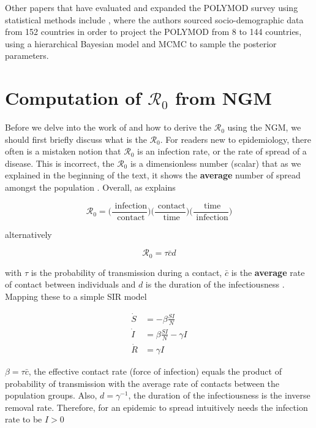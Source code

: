 \documentclass[12pt]{article}
\begin{document}
Other papers that have evaluated and expanded the POLYMOD survey using statistical methods include \cite{Kiesha:2017}, where the authors sourced socio-demographic data from 152 countries in order to project the POLYMOD from 8 to 144 countries, using a hierarchical Bayesian model and MCMC to sample the posterior parameters.

\section{Computation of $\mathcal{R}_{0}$ from NGM}
\label{sec:2}

Before we delve into the work of \cite{Diekmann:2010} and how to derive the $\mathcal{R}_{0}$ using the NGM, we should first briefly discuss what is the $\mathcal{R}_{0}$. For readers new to epidemiology, there often is a mistaken notion that $\mathcal{R}_{0}$ is an infection rate, or the rate of spread of a disease. This is incorrect, the $\mathcal{R}_{0}$ is a dimensionless number (scalar) that as we explained in the beginning of the text, it shows the \textbf{average} number of spread amongst the population \cite{ma2009mathematical, Jones:2007}. Overall, as \cite{Jones:2007} explains 

\begin{equation*}
\mathcal{R}_{0}= \bigg(\frac{\mbox{ infection}}{\mbox{ contact}}\bigg) \bigg(\frac{\mbox{ contact}}{\mbox{ time}}\bigg) \bigg(\frac{\mbox{ time}}{\mbox{ infection}}\bigg) 
\end{equation*}

alternatively

\begin{equation}
\mathcal{R}_{0}= \tau \bar{c} d
\label{eq:10}
\end{equation}

with $\tau$ is the probability of transmission during a contact, $\bar{c}$ is the \textbf{average} rate of contact between individuals and $d$ is the duration of the infectiousness \cite[p.1]{Jones:2007}. Mapping these to a simple SIR model

\begin{align*}
\dot{S} & =  - \beta \frac{SI}{N} \\
\dot{I}  & =  \beta \frac{SI}{N} - \gamma I  \\
\dot{R}  & =  \gamma I 
\end{align*}

$\beta=\tau \bar{c}$, the effective contact rate (force of infection) equals the product of probability of transmission with the average rate of contacts between the population groups.  Also, $d=\gamma^{-1}$, the duration of the infectiousness is the inverse removal rate. Therefore, for an epidemic to spread intuitively needs the infection rate to be $I>0$
\end{document}
